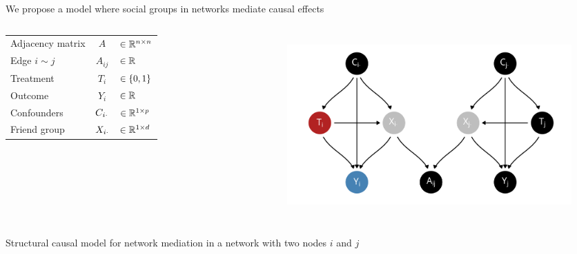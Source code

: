 \documentclass[aspectratio=169]{beamer}
\theoremstyle{remark}
\begin{document}
\begin{frame}{We propose a model where social groups in networks mediate causal effects}

    \begin{columns}


        \footnotesize

        \begin{table}[]
            \begin{tabular}{lcl}
                Adjacency matrix & $A$            & $\in \mathbb{R}^{n \times n}$ \\
                Edge $i \sim j$  & $A_{ij}$       & $\in \mathbb{R}$              \\
                Treatment        & $T_i$          & $\in \{0, 1\}$      \\
                Outcome          & $Y_i$          & $\in \mathbb{R}$              \\
                Confounders      & $C_{i \cdot}$ & $\in \mathbb{R}^{1 \times p}$ \\
                Friend group     & $X_{i \cdot}$ & $\in \mathbb{R}^{1 \times d}$
            \end{tabular}
        \end{table}


        \begin{figure}[ht]
            \centering
            \includegraphics[width=\textwidth]{figures/dags/homophily-mediating.png}
            \label{fig:mediating}
        \end{figure}
    \end{columns}

    \centering
    \scriptsize Structural causal model for network mediation in a network with two nodes $i$ and $j$





\end{frame}
\end{document}
